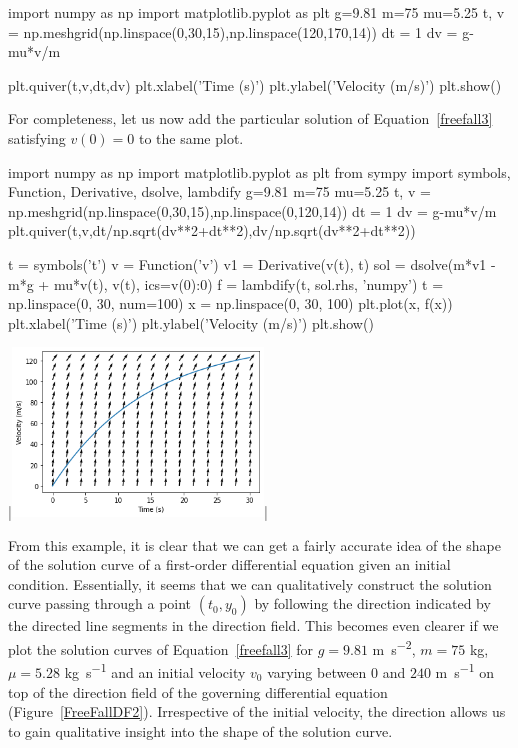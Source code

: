 \begin{example}
\begin{pyin}
import numpy as np
import matplotlib.pyplot as plt
g=9.81
m=75
mu=5.25
t, v = np.meshgrid(np.linspace(0,30,15),np.linspace(120,170,14))
dt = 1
dv = g-mu*v/m

plt.quiver(t,v,dt,dv)
plt.xlabel('Time (s)')
plt.ylabel('Velocity (m/s)')
plt.show()
\end{pyin}

For completeness, let us now add the particular solution of Equation~\eqref{freefall3} satisfying $v(0)=0$ to the same plot.
\begin{pyin}
import numpy as np
import matplotlib.pyplot as plt
from sympy import symbols, Function, Derivative, dsolve, lambdify
g=9.81
m=75
mu=5.25
t, v = np.meshgrid(np.linspace(0,30,15),np.linspace(0,120,14))
dt = 1
dv = g-mu*v/m
plt.quiver(t,v,dt/np.sqrt(dv**2+dt**2),dv/np.sqrt(dv**2+dt**2))

t = symbols('t')
v = Function('v')
v1 = Derivative(v(t), t)
sol = dsolve(m*v1 - m*g + mu*v(t), v(t), ics={v(0):0})
f = lambdify(t, sol.rhs, 'numpy')
t = np.linspace(0, 30, num=100)
x = np.linspace(0, 30, 100)
plt.plot(x, f(x))
plt.xlabel('Time (s)')
plt.ylabel('Velocity (m/s)')
plt.show()
\end{pyin}
\begin{pyout}
|\includegraphics[width=0.5\textwidth]{FreeFall_DF2_Python.png}|
\end{pyout}
\fi
\end{example}

From this example, it is clear that we can get a fairly accurate idea of the shape of the solution curve of a first-order differential equation given an initial condition. Essentially, it seems that we can qualitatively construct the solution curve passing through a point $(t_0,y_0)$ by following the direction indicated by the directed line segments in the direction field. This becomes even clearer if we plot the solution curves of Equation~\eqref{freefall3} for $g=9.81$ \si{m.s^{-2}}, $m=75$ \si{kg}, $\mu=5.28$ \si{kg.s^{-1}}  and an initial velocity $v_0$ varying between $0$ and $240$ \si{m.s^{-1}} on top of the direction field of the governing differential equation (Figure~\ref{FreeFallDF2}). Irrespective of the initial velocity, the direction allows us to gain qualitative insight into the shape of the solution curve. 

